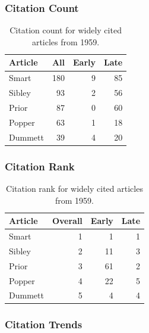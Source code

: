 \documentclass[
  10pt,
  letterpaper,
  DIV=11,
  numbers=noendperiod,
  twoside]{scrartcl}
\begin{document}
\subsubsection*{Citation Count}\label{sec-count-1959}

\begin{longtable}[]{@{}lrrr@{}}

\caption{\label{tbl-citation-count-1959}Citation count for widely cited
articles from 1959.}

\tabularnewline

\toprule\noalign{}
Article & All & Early & Late \\
\midrule\noalign{}
\endhead
\bottomrule\noalign{}
\endlastfoot
Smart & 180 & 9 & 85 \\
Sibley & 93 & 2 & 56 \\
Prior & 87 & 0 & 60 \\
Popper & 63 & 1 & 18 \\
Dummett & 39 & 4 & 20 \\

\end{longtable}

\subsubsection*{Citation Rank}\label{sec-rank-1959}

\begin{longtable}[]{@{}lrrr@{}}

\caption{\label{tbl-citation-rank-1959}Citation rank for widely cited
articles from 1959.}

\tabularnewline

\toprule\noalign{}
Article & Overall & Early & Late \\
\midrule\noalign{}
\endhead
\bottomrule\noalign{}
\endlastfoot
Smart & 1 & 1 & 1 \\
Sibley & 2 & 11 & 3 \\
Prior & 3 & 61 & 2 \\
Popper & 4 & 22 & 5 \\
Dummett & 5 & 4 & 4 \\

\end{longtable}

\subsubsection*{Citation Trends}\label{sec-trends-1959}
\end{document}
